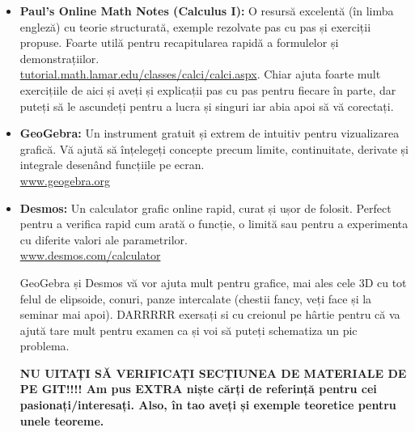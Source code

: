 \documentclass[11pt,a4paper]{article}
\theoremstyle{definition}
\theoremstyle{plain}
\theoremstyle{remark}
\begin{document}
\begin{itemize}
    \item \textbf{Paul's Online Math Notes (Calculus I):} O resursă excelentă (în limba engleză) cu teorie structurată, exemple rezolvate pas cu pas și exerciții propuse. Foarte utilă pentru recapitularea rapidă a formulelor și demonstrațiilor.\\
    \href{https://tutorial.math.lamar.edu/classes/calci/calci.aspx}{tutorial.math.lamar.edu/classes/calci/calci.aspx}. Chiar ajuta foarte mult exercițiile de aici și aveți și explicații pas  cu pas pentru fiecare în parte, dar puteți să le ascundeți pentru a lucra și singuri iar abia apoi să vă corectați.

    \item \textbf{GeoGebra:} Un instrument gratuit și extrem de intuitiv pentru vizualizarea grafică. Vă ajută să înțelegeți concepte precum limite, continuitate, derivate și integrale desenând funcțiile pe ecran.\\
    \href{https://www.geogebra.org/}{www.geogebra.org}

    \item \textbf{Desmos:} Un calculator grafic online rapid, curat și ușor de folosit. Perfect pentru a verifica rapid cum arată o funcție, o limită sau pentru a experimenta cu diferite valori ale parametrilor.\\
    \href{https://www.desmos.com/calculator}{www.desmos.com/calculator}

    GeoGebra și Desmos vă vor ajuta mult pentru grafice, mai ales cele 3D cu tot felul de elipsoide, conuri, panze intercalate (chestii fancy, veți face și la seminar mai apoi). DARRRRR exersați si cu creionul pe hârtie pentru că va ajută tare mult pentru examen ca și voi să puteți schematiza un pic problema.

    \textbf{NU UITAȚI SĂ VERIFICAȚI SECȚIUNEA DE MATERIALE DE PE GIT!!!! Am pus EXTRA niște cărți de referință pentru cei pasionați/interesați. Also, în tao aveți și exemple teoretice pentru unele teoreme.}
\end{itemize}
\end{document}
